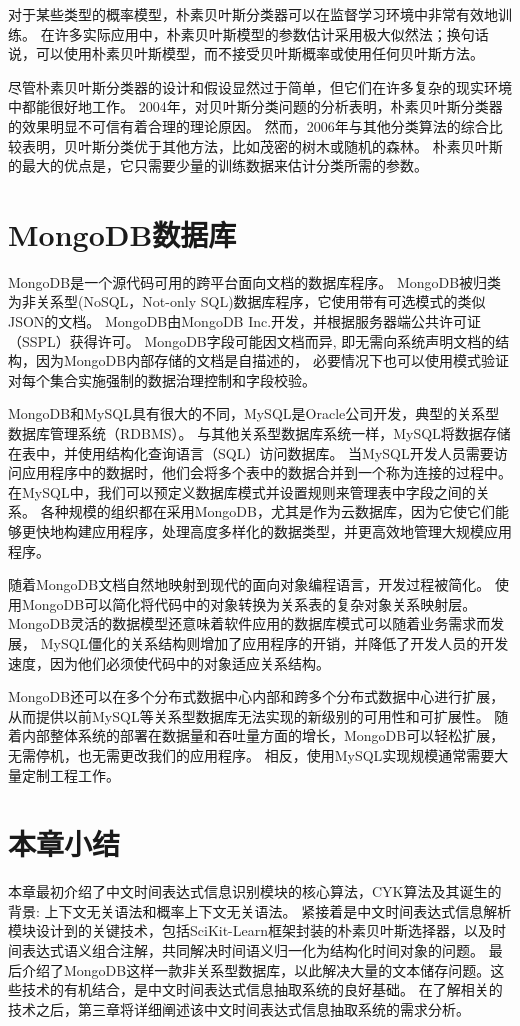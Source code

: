 对于某些类型的概率模型，朴素贝叶斯分类器可以在监督学习环境中非常有效地训练。
在许多实际应用中，朴素贝叶斯模型的参数估计采用极大似然法；换句话说，可以使用朴素贝叶斯模型，而不接受贝叶斯概率或使用任何贝叶斯方法\cite{hand2007idiot}。

尽管朴素贝叶斯分类器的设计和假设显然过于简单，但它们在许多复杂的现实环境中都能很好地工作。
2004年，对贝叶斯分类问题的分析表明，朴素贝叶斯分类器的效果明显不可信有着合理的理论原因。
然而，2006年与其他分类算法的综合比较表明，贝叶斯分类优于其他方法，比如茂密的树木或随机的森林。
朴素贝叶斯的最大的优点是，它只需要少量的训练数据来估计分类所需的参数\cite{10.1145/1143844.1143865}。


\section{MongoDB数据库}

MongoDB是一个源代码可用的跨平台面向文档的数据库程序。
MongoDB被归类为非关系型(NoSQL，Not-only SQL)数据库程序，它使用带有可选模式的类似JSON的文档。
MongoDB由MongoDB Inc.开发，并根据服务器端公共许可证（SSPL）获得许可。
MongoDB字段可能因文档而异, 即无需向系统声明文档的结构，因为MongoDB内部存储的文档是自描述的，
必要情况下也可以使用模式验证对每个集合实施强制的数据治理控制和字段校验。

MongoDB和MySQL具有很大的不同\cite{Győrödi2015comparative}，MySQL是Oracle公司开发，典型的关系型数据库管理系统（RDBMS）。
与其他关系型数据库系统一样，MySQL将数据存储在表中，并使用结构化查询语言（SQL）访问数据库。
当MySQL开发人员需要访问应用程序中的数据时，他们会将多个表中的数据合并到一个称为连接的过程中。
在MySQL中，我们可以预定义数据库模式并设置规则来管理表中字段之间的关系。
各种规模的组织都在采用MongoDB，尤其是作为云数据库，因为它使它们能够更快地构建应用程序，处理高度多样化的数据类型，并更高效地管理大规模应用程序。

随着MongoDB文档自然地映射到现代的面向对象编程语言，开发过程被简化。
使用MongoDB可以简化将代码中的对象转换为关系表的复杂对象关系映射层。
MongoDB灵活的数据模型还意味着软件应用的数据库模式可以随着业务需求而发展，
MySQL僵化的关系结构则增加了应用程序的开销，并降低了开发人员的开发速度，因为他们必须使代码中的对象适应关系结构。

MongoDB还可以在多个分布式数据中心内部和跨多个分布式数据中心进行扩展，从而提供以前MySQL等关系型数据库无法实现的新级别的可用性和可扩展性。
随着内部整体系统的部署在数据量和吞吐量方面的增长，MongoDB可以轻松扩展，无需停机，也无需更改我们的应用程序。
相反，使用MySQL实现规模通常需要大量定制工程工作。

\section{本章小结}

本章最初介绍了中文时间表达式信息识别模块的核心算法，CYK算法及其诞生的背景: 上下文无关语法和概率上下文无关语法。
紧接着是中文时间表达式信息解析模块设计到的关键技术，包括SciKit-Learn框架封装的朴素贝叶斯选择器，以及时间表达式语义组合注解，共同解决时间语义归一化为结构化时间对象的问题。
最后介绍了MongoDB这样一款非关系型数据库，以此解决大量的文本储存问题。这些技术的有机结合，是中文时间表达式信息抽取系统的良好基础。
在了解相关的技术之后，第三章将详细阐述该中文时间表达式信息抽取系统的需求分析。
